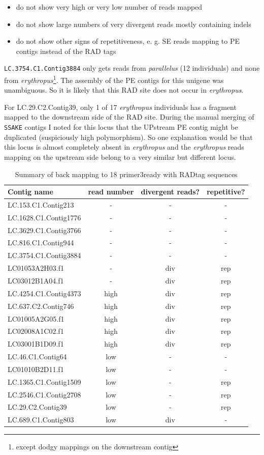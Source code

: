 \documentclass{article}\usepackage[]{graphicx}\usepackage[]{color}
\begin{document}
\begin{itemize}
\item do not show very high or very low number of reads mapped
\item do not show large numbers of very divergent reads mostly containing indels
\item do not show other signs of repetitiveness, e. g. SE reads mapping to PE contigs instead of the RAD tags
\end{itemize}

\texttt{LC.3754.C1.Contig3884} only gets reads from \textit{parallelus} (12 individuals) and none from \textit{erythropus}\footnote{except dodgy mappings on the downstream contig}. The assembly of the PE contigs for this unigene was unambiguous. So it is likely that this RAD site does not occur in \textit{erythropus}.


For LC.29.C2.Contig39, only 1 of 17 \textit{erythropus} individuals has a fragment mapped to the downstream side of the RAD site. During the manual merging of \texttt{SSAKE} contigs I noted for this locus that the UPstream PE contig might be duplicated (suspiciously high polymorphism). So one explanation would be that this locus is almost completely absent in \textit{erythropus} and the \textit{erythropus} reads mapping on the upstream side belong to a very similar but different locus.
  
\begin{table}
\centering
\caption{Summary of back mapping to 18 primer3ready with RADtag sequences}
\label{back-mapping-summary}
\begin{tabular}{lccc}
\toprule
Contig name & read number & divergent reads? & repetitive?\\
\midrule
LC.153.C1.Contig213 & - & - & - \\
LC.1628.C1.Contig1776 & - & - & - \\
LC.3629.C1.Contig3766 & - & - & - \\
LC.816.C1.Contig944 & - & - & - \\
LC.3754.C1.Contig3884 & - & - & - \\
LC01053A2H03.f1 & - & div & rep \\
LC03012B1A04.f1 & - & div & rep \\
LC.4254.C1.Contig4373 & high & div & rep \\
LC.637.C2.Contig746 & high & div & rep \\
LC01005A2G05.f1 & high & div & rep \\
LC02008A1C02.f1 & high & div & rep \\
LC03001B1D09.f1 & high & div & rep \\
LC.46.C1.Contig64 & low & - & - \\
LC01010B2D11.f1 & low & - & - \\
LC.1365.C1.Contig1509 & low & - & rep \\
LC.2546.C1.Contig2708 & low & - & rep \\
LC.29.C2.Contig39 & low & - & rep \\
LC.689.C1.Contig803 & low & div & - \\
\bottomrule
\end{tabular}
\end{table}
\end{document}
